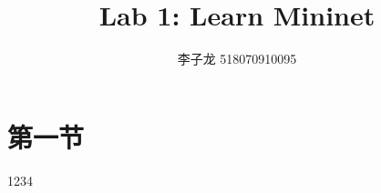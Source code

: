 \documentclass[UTF8]{ctexart}
\author{李子龙 518070910095}
\begin{document}
    \title{Lab 1: Learn Mininet}
    \maketitle
    \tableofcontents
    \clearpage
    \section{第一节}
    \begin{definition}
        1234
    \end{definition}
\end{document}
